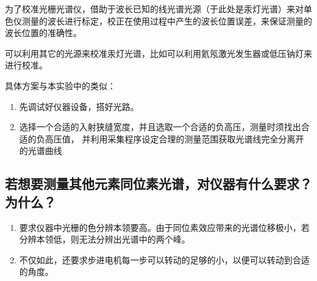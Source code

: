 \documentclass[a4paper,UTF8]{ctexart}
\begin{document}
为了校准光栅光谱仪，借助于波长已知的线光谱光源（于此处是汞灯光谱）来对单色仪测量的波长进行标定，校正在使用过程中产生的波长位置误差，来保证测量的波长位置的准确性。

可以利用其它的光源来校准汞灯光谱，比如可以利用氦氖激光发生器或低压钠灯来进行校准。

具体方案与本实验中的类似：

\begin{enumerate}
    \item 先调试好仪器设备，搭好光路。
    \item 选择一个合适的入射狭缝宽度，并且选取一个合适的负高压，测量时须找出合适的负高压值，
    并利用采集程序设定合理的测量范围获取光谱线完全分离开的光谱曲线
\end{enumerate}

\subsection{若想要测量其他元素同位素光谱，对仪器有什么要求？为什么？}

\begin{enumerate}
    \item 要求仪器中光栅的色分辨本领要高。由于同位素效应带来的光谱位移极小，若分辨本领低，则无法分辨出光谱中的两个峰。
    \item 不仅如此，还要求步进电机每一步可以转动的足够的小，以便可以转动到合适的角度。
\end{enumerate}
\end{document}
